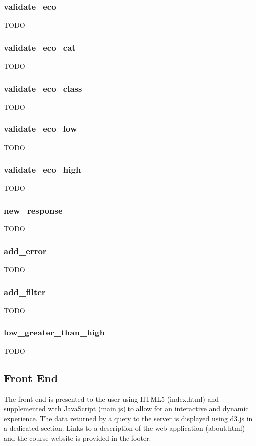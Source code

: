 \documentclass{article}
\begin{document}
\subsubsection*{validate\_eco}
TODO

\subsubsection*{validate\_eco\_cat}
TODO

\subsubsection*{validate\_eco\_class}
TODO

\subsubsection*{validate\_eco\_low}
TODO

\subsubsection*{validate\_eco\_high}
TODO

\subsubsection*{new\_response}
TODO

\subsubsection*{add\_error}
TODO

\subsubsection*{add\_filter}
TODO

\subsubsection*{low\_greater\_than\_high}
TODO


\subsection{Front End}

The front end is presented to the user using HTML5 (index.html) and supplemented with JavaScript (main.js) to allow for an interactive and dynamic experience.  The data returned by a query to the server is displayed using d3.js in a dedicated section.  Links to a description of the web application (about.html) and the course
website is provided in the footer.
\end{document}
